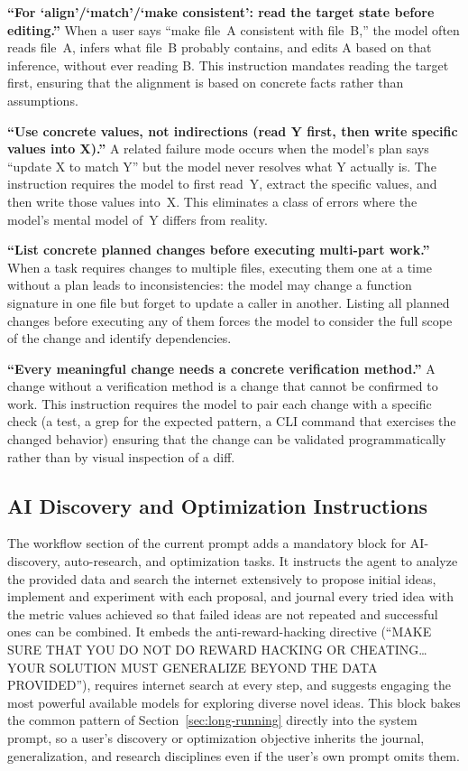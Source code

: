 \documentclass{article}
\begin{document}
\textbf{``For `align'/`match'/`make consistent': read the target state before editing.''}  When a user says ``make file~A consistent with file~B,'' the model often reads file~A, infers what file~B probably contains, and edits A based on that inference, without ever reading B.  This instruction mandates reading the target first, ensuring that the alignment is based on concrete facts rather than assumptions.

\textbf{``Use concrete values, not indirections (read Y first, then write specific values into X).''}  A related failure mode occurs when the model's plan says ``update X to match Y'' but the model never resolves what Y actually is.  The instruction requires the model to first read~Y, extract the specific values, and then write those values into~X.  This eliminates a class of errors where the model's mental model of~Y differs from reality.

\textbf{``List concrete planned changes before executing multi-part work.''}  When a task requires changes to multiple files, executing them one at a time without a plan leads to inconsistencies: the model may change a function signature in one file but forget to update a caller in another.  Listing all planned changes before executing any of them forces the model to consider the full scope of the change and identify dependencies.

\textbf{``Every meaningful change needs a concrete verification method.''}  A change without a verification method is a change that cannot be confirmed to work.  This instruction requires the model to pair each change with a specific check (a test, a grep for the expected pattern, a CLI command that exercises the changed behavior) ensuring that the change can be validated programmatically rather than by visual inspection of a diff.

\subsection{AI Discovery and Optimization Instructions}

The workflow section of the current prompt adds a mandatory block for AI-discovery, auto-research, and optimization tasks.  It instructs the agent to analyze the provided data and search the internet extensively to propose initial ideas, implement and experiment with each proposal, and journal every tried idea with the metric values achieved so that failed ideas are not repeated and successful ones can be combined.  It embeds the anti-reward-hacking directive (``MAKE SURE THAT YOU DO NOT DO REWARD HACKING OR CHEATING\ldots YOUR SOLUTION MUST GENERALIZE BEYOND THE DATA PROVIDED''), requires internet search at every step, and suggests engaging the most powerful available models for exploring diverse novel ideas.  This block bakes the common pattern of Section~\ref{sec:long-running} directly into the system prompt, so a user's discovery or optimization objective inherits the journal, generalization, and research disciplines even if the user's own prompt omits them.
\end{document}
